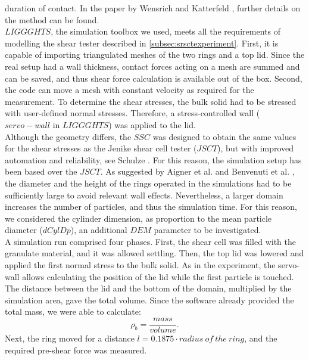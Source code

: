 \documentclass[review]{elsarticle}
\begin{document}
\begin{appendix}
duration of contact.
In the paper by Wensrich and Katterfeld \cite{RefWorks:87}, further details on
the method can be found.\\
$LIGGGHTS$, the simulation toolbox we used, meets all the requirements of
modelling the shear tester described in \ref{subsec:srsctexperiment}. 
First, it is capable of importing triangulated meshes of the two rings and a top lid. 
Since the real setup had a wall thickness, contact forces acting on a mesh are summed and can be saved, 
and thus shear force calculation is available out of the box. 
Second, the code can move a mesh with constant 
velocity as required for the measurement. To determine the shear stresses, the bulk solid had to be stressed with 
user-defined normal stresses. Therefore, a stress-controlled wall ($servo-wall$ in $LIGGGHTS$) was applied to the lid. \\
Although the geometry differs, the $SSC$ was designed to obtain the same values for the shear stresses as the 
Jenike shear cell tester ($JSCT$), but with improved automation and reliability,
see Schulze \cite{RefWorks:118}. 
For this reason, the simulation setup has been
based over the $JSCT$.
As suggested by Aigner et al. \cite{RefWorks:139} and Benvenuti et al. \cite{RefWorks:173}, 
the diameter and the height of the rings operated in the simulations had to be sufficiently large to avoid relevant wall effects. 
Nevertheless, a larger domain increases the number of particles, and thus the simulation time. 
For this reason, we considered the cylinder dimension, as proportion to the mean particle diameter ($dCylDp$), 
an additional $DEM$ parameter to be investigated. \\   
A simulation run comprised four phases. 
First, the shear cell was filled with the granulate material, and it was allowed
settling.
Then, the top lid was lowered and applied the first normal stress to the bulk solid. 
As in the experiment, the servo-wall allows calculating the position of the lid
while the first particle is touched. 
The distance between the lid and the bottom of the domain, multiplied by the 
simulation area, gave the total volume.
Since the software already provided the total mass, we were able to calculate:
\begin{equation}
\rho_b = \frac{mass}{volume}.
 \label{eq:rhob}
\end{equation}
Next, the ring moved for a distance $l=0.1875 \cdot radius ~of ~the ~ring$, and the required pre-shear force was measured. 

\end{appendix}
\end{document}
